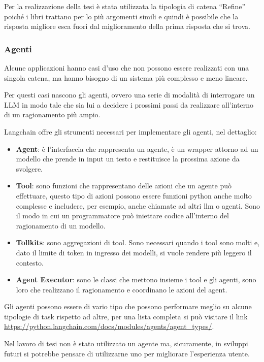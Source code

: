 Per la realizzazione della tesi è stata utilizzata la tipologia di catena ``Refine'' poiché i libri trattano per lo più argomenti simili e quindi è possibile che la risposta migliore esca fuori dal miglioramento della prima risposta che si trova.

\subsubsection*{Agenti}

Alcune applicazioni hanno casi d'uso che non possono essere realizzati con una singola catena, ma hanno bisogno di un sistema più complesso e meno lineare.

Per questi casi nascono gli agenti, ovvero una serie di modalità di interrogare un LLM in modo tale che sia lui a decidere i prossimi passi da realizzare all'interno di un ragionamento più ampio.

Langchain offre gli strumenti necessari per implementare gli agenti, nel dettaglio:

\begin{itemize}
    \item \textbf{Agent}: è l'interfaccia che rappresenta un agente, è un wrapper attorno ad un modello che prende in input un testo e restituisce la prossima azione da svolgere.
    \item \textbf{Tool}: sono funzioni che rappresentano delle azioni che un agente può effettuare, questo tipo di azioni possono essere funzioni python anche molto complesse e includere, per esempio, anche chiamate ad altri llm o agenti. Sono il modo in cui un programmatore può iniettare codice all'interno del ragionamento di un modello.
    \item \textbf{Tollkits}: sono aggregazioni di tool. Sono necessari quando i tool sono molti e, dato il limite di token in ingresso dei modelli, si vuole rendere più leggero il contesto.
    \item \textbf{Agent Executor}: sono le classi che mettono insieme i tool e gli agenti, sono loro che realizzano il ragionamento e coordinano le azioni del agent.
\end{itemize}

Gli agenti possono essere di vario tipo che possono performare meglio su alcune tipologie di task rispetto ad altre, per una lista completa si può visitare il link \url{https://python.langchain.com/docs/modules/agents/agent_types/}.

Nel lavoro di tesi non è stato utilizzato un agente ma, sicuramente, in sviluppi futuri si potrebbe pensare di utilizzarne uno per migliorare l'esperienza utente.

